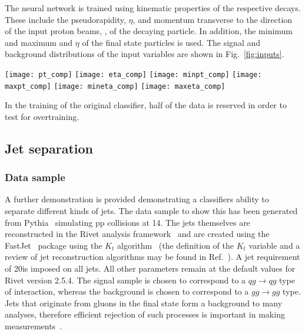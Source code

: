 The neural network is trained using kinematic properties of the respective decays.
These include the pseudorapidity, $\eta$, and momentum transverse to the direction of the
input proton beams, \pt, of the decaying particle. In addition, the minimum and maximum \pt and $\eta$
of the final state particles is used. The signal and background distributions of the input variables
are shown in Fig.~\ref{fig:inputs}.
%
\begin{figure*}[t]
\centering
\texttt{[image: pt\_comp]}
\texttt{[image: eta\_comp]}
\texttt{[image: minpt\_comp]}
\texttt{[image: maxpt\_comp]}
\texttt{[image: mineta\_comp]}
\texttt{[image: maxeta\_comp]}
\caption{\small Comparison of the signal and background distributions
used to train the Keras B decay classifier.}
\label{fig:inputs}
\end{figure*}

In the training of the original classifier, half of the data is
reserved in order to test for overtraining.


\subsection{Jet separation}
\label{sec:hepGPD}

\subsubsection{Data sample}

A further demonstration is provided demonstrating a classifiers ability to separate different
kinds of jets. The data sample to show this has been generated from Pythia~\cite{Sjostrand:2007gs}
simulating pp collisions at 14\tev.
The jets themselves are reconstructed in the Rivet analysis framework~\cite{Buckley:2010ar}
and are created using the FastJet~\cite{Cacciari:2011ma} package using the $K_t$ algorithm~\cite{Salam:2007xv}
(the definition
of the $K_t$ variable and a review of jet reconstruction algorithms
may be found in Ref.~\cite{Atkin:2015msa}).
A jet \pt requirement of 20\gev is imposed on all jets.
All other parameters remain at the default values for Rivet version 2.5.4.
The signal sample is chosen to correspond to a $qg\to qg$ type of interaction,
whereas the background is chosen to correspond to a $gg \to gg$ type.
Jets that originate from gluons in the final state form a background to many
analyses, therefore efficient rejection of such processes is important in making
measurements~\cite{Komiske:2016rsd}.

